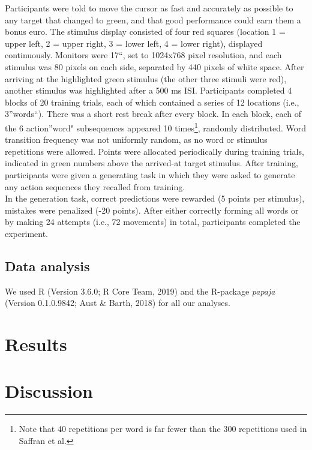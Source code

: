 \documentclass[man]{apa6}
\let\rmarkdownfootnote\footnote%
\def\footnote{\protect\rmarkdownfootnote}
\begin{document}
Participants were told to move the cursor as fast and accurately as possible to any target that changed to green, and that good performance could earn them a bonus euro.
The stimulus display consisted of four red squares (location 1 = upper left, 2 = upper right, 3 = lower left, 4 = lower right), displayed continuously.
Monitors were 17\enquote{, set to 1024x768 pixel resolution, and each stimulus was 80 pixels on each side, separated by 440 pixels of white space.
After arriving at the highlighted green stimulus (the other three stimuli were red), another stimulus was highlighted after a 500 ms ISI.
Participants completed 4 blocks of 20 training trials, each of which contained a series of 12 locations (i.e., 3}words\enquote{).
There was a short rest break after every block.
In each block, each of the 6 action}word" subsequences appeared 10 times\footnote{Note that 40 repetitions per word is far fewer than the 300 repetitions used in Saffran et al.}, randomly distributed.
Word transition frequency was not uniformly random, as no word or stimulus repetitions were allowed.
Points were allocated periodically during training trials, indicated in green numbers above the arrived-at target stimulus.
After training, participants were given a generating task in which they were asked to generate any action sequences they recalled from training.\\
In the generation task, correct predictions were rewarded (5 points per stimulus), mistakes were penalized (-20 points).
After either correctly forming all words or by making 24 attempts (i.e., 72 movements) in total, participants completed the experiment.

\hypertarget{data-analysis}{%
\subsection{Data analysis}\label{data-analysis}}

We used R (Version 3.6.0; R Core Team, 2019) and the R-package \emph{papaja} (Version 0.1.0.9842; Aust \& Barth, 2018) for all our analyses.

\hypertarget{results}{%
\section{Results}\label{results}}

\hypertarget{discussion}{%
\section{Discussion}\label{discussion}}
\end{document}
